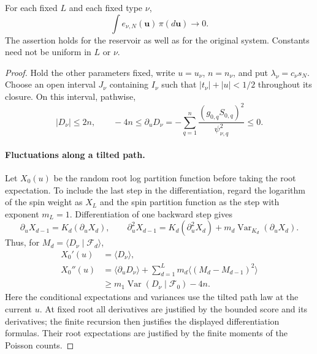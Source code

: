 \begin{lemma}
\label{pert:concentration}
For each fixed $L$ and each fixed type $\nu$,
\begin{equation}
 \int e_{\nu,N}(\mathbf u)\,\pi(d\mathbf u)\longrightarrow0.
 \label{pert:concentration-eq}
\end{equation}
The assertion holds for the reservoir as well as for the original
system.  Constants need not be uniform in $L$ or $\nu$.
\end{lemma}

\begin{proof}
Hold the other parameters fixed, write $u=u_\nu$, $n=n_\nu$, and put
$\lambda_\nu=c_\nu s_N$.  Choose an open interval $J_\nu$ containing
$I_\nu$ such that $|t_\nu|+|u|<1/2$ throughout its closure.  On this
interval, pathwise,
\begin{equation}
 |D_\nu|\leq2n,\qquad
 -4n\leq\partial_uD_\nu
 =-\sum_{q=1}^{n}
 \frac{(g_{0,q}S_{0,q})^2}{\psi_{\nu,q}^{2}}
 \leq0.
 \label{pert:score-bounds}
\end{equation}

\paragraph{Fluctuations along a tilted path.}
Let $X_0(u)$ be the random root log partition function before taking the
root expectation.  To include the last step in the differentiation,
regard the logarithm of the spin weight as $X_L$ and the spin partition
function as the step with exponent $m_L=1$.  Differentiation of one
backward step gives
\[
 \partial_uX_{d-1}=K_d(\partial_uX_d),\qquad
 \partial_u^2X_{d-1}
 =K_d(\partial_u^2X_d)
   +m_d\operatorname{Var}_{K_d}(\partial_uX_d).
\]
Thus, for $M_d=\langle D_\nu\mid\mathscr F_d\rangle$,
\begin{align}
 X_0'(u)&=\langle D_\nu\rangle,\label{pert:first-derivative}\\
 X_0''(u)&=\langle\partial_uD_\nu\rangle
   +\sum_{d=1}^{L}m_d
        \langle(M_d-M_{d-1})^2\rangle \nonumber\\
 &\geq m_1\operatorname{Var}(D_\nu\mid\mathscr F_0)-4n.
 \label{pert:second-derivative}
\end{align}
Here the conditional expectations and variances use the tilted path
law at the current $u$.  At fixed root all derivatives are justified by
the bounded score and its derivatives; the finite recursion then
justifies the displayed differentiation formulas.  Their root
expectations are justified by the finite moments of the Poisson counts.


\end{proof}
